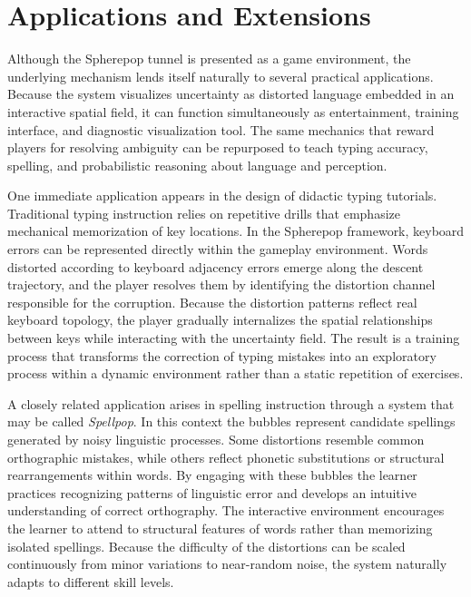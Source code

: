 \documentclass[11pt]{article}
\begin{document}
\section{Applications and Extensions}

Although the Spherepop tunnel is presented as a game environment, the underlying mechanism lends itself naturally to several practical applications. Because the system visualizes uncertainty as distorted language embedded in an interactive spatial field, it can function simultaneously as entertainment, training interface, and diagnostic visualization tool. The same mechanics that reward players for resolving ambiguity can be repurposed to teach typing accuracy, spelling, and probabilistic reasoning about language and perception.

One immediate application appears in the design of didactic typing tutorials. Traditional typing instruction relies on repetitive drills that emphasize mechanical memorization of key locations. In the Spherepop framework, keyboard errors can be represented directly within the gameplay environment. Words distorted according to keyboard adjacency errors emerge along the descent trajectory, and the player resolves them by identifying the distortion channel responsible for the corruption. Because the distortion patterns reflect real keyboard topology, the player gradually internalizes the spatial relationships between keys while interacting with the uncertainty field. The result is a training process that transforms the correction of typing mistakes into an exploratory process within a dynamic environment rather than a static repetition of exercises.

A closely related application arises in spelling instruction through a system that may be called \emph{Spellpop}. In this context the bubbles represent candidate spellings generated by noisy linguistic processes. Some distortions resemble common orthographic mistakes, while others reflect phonetic substitutions or structural rearrangements within words. By engaging with these bubbles the learner practices recognizing patterns of linguistic error and develops an intuitive understanding of correct orthography. The interactive environment encourages the learner to attend to structural features of words rather than memorizing isolated spellings. Because the difficulty of the distortions can be scaled continuously from minor variations to near-random noise, the system naturally adapts to different skill levels.
\end{document}
